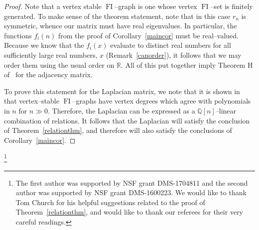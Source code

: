 \documentclass[10pt]{amsart}
\DeclareMathOperator{\FI}{FI}
\newcommand{\R}{\mathbb{R}}
\newcommand{\Q}{\mathbb{Q}}
\theoremstyle{definition}
\begin{document}
\begin{proof}
Note that a vertex stable $\FI$--graph is one whose vertex $\FI$--set is finitely generated. To make sense of the theorem statement, note that in this case $r_n$ is symmetric, whence our matrix must have real eigenvalues. In particular, the functions $f_i(n)$ from the proof of Corollary~\ref{maincor} must be real--valued. Because we know that the $f_i(x)$ evaluate to distinct real numbers for all sufficiently large real numbers, $x$ (Remark~\ref{canorder}), it follows that we may order them using the usual order on $\R$. All of this put together imply Theorem H of~\cite{RW} for the adjacency matrix.

To prove this statement for the Laplacian matrix, we note that it is shown in~\cite{RW} that vertex--stable $\FI$--graphs have vertex degrees which agree with polynomials in $n$ for $n \gg 0$. Therefore, the Laplacian can be expressed as a $\Q[n]$--linear combination of relations. It follows that the Laplacian will satisfy the conclusion of Theorem~\ref{relationthm}, and therefore will also satisfy the conclusions of Corollary~\ref{maincor}.
\end{proof}


\thanks{The first author was supported by NSF grant DMS-1704811 and the second author was supported by NSF grant DMS-1600223. We would like to thank Tom Church for his helpful suggestions related to the proof of Theorem~\ref{relationthm}, and would like to thank our referees for their very careful readings.}
\end{document}
